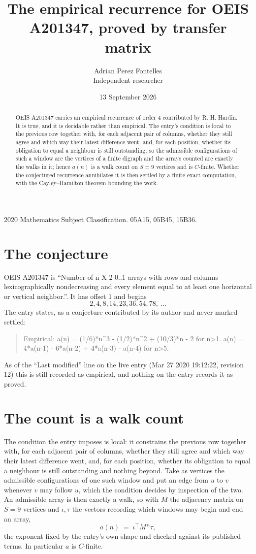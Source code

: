 \documentclass[11pt,a4paper]{article}
\title{The empirical recurrence for OEIS A201347, proved by transfer matrix}
\author{Adrian Perez Fontelles\\ \small Independent researcher}
\date{13 September 2026}
\theoremstyle{plain}
\theoremstyle{definition}
\begin{document}
\maketitle

\begin{abstract}
OEIS A201347 carries an empirical recurrence of order $4$ contributed by R. H. Hardin. It is
true, and it is decidable rather than empirical. The entry's condition is local to the previous row together with, for each adjacent pair of columns, whether they still agree and which way their latest difference went, and, for each position, whether its obligation to equal a neighbour is still outstanding, so
the admissible configurations of such a window are the vertices of a finite digraph and the
arrays counted are exactly the walks in it; hence $a(n)$ is a walk count on $S=9$ vertices
and is $C$-finite. Whether the conjectured recurrence annihilates it is then settled by a
finite exact computation, with the Cayley--Hamilton theorem bounding the work.
\end{abstract}

\noindent\small 2020 Mathematics Subject Classification. 05A15, 05B45, 15B36.\normalsize

\section{The conjecture}

OEIS A201347 is ``Number of n X 2 0..1 arrays with rows and columns lexicographically nondecreasing and every element equal to at least one horizontal or vertical neighbor.''. It has offset $1$ and begins
\[
2, 4, 8, 14, 23, 36, 54, 78,\ \dots
\]
The entry states, as a conjecture contributed by its author and never marked settled:
\begin{quote}
Empirical: a(n) = (1/6)*n\^{}3 - (1/2)*n\^{}2 + (10/3)*n - 2 for n>1. a(n) = 4*a(n-1) - 6*a(n-2) + 4*a(n-3) - a(n-4) for n>5.
\end{quote}
As of the ``Last modified'' line on the live entry (Mar 27 2020 19:12:22, revision 12) this is still
recorded as empirical, and nothing on the entry records it as proved.

\section{The count is a walk count}

The condition the entry imposes is local: it constrains the previous row together with, for each adjacent pair of columns, whether they still agree and which way their latest difference went, and, for each position, whether its obligation to equal a neighbour is still outstanding and nothing beyond. Take as
vertices the admissible configurations of one such window and put an edge from $u$ to $v$
whenever $v$ may follow $u$, which the condition decides by inspection of the two. An
admissible array is then exactly a walk, so with $M$ the adjacency matrix on $S=9$ vertices
and $\iota,\tau$ the vectors recording which windows may begin and end an array,
\[
a(n)\;=\;\iota^{\!\top}M^{\,n}\tau ,
\]
the exponent fixed by the entry's own shape and checked against its published terms. In
particular $a$ is $C$-finite.
\end{document}
